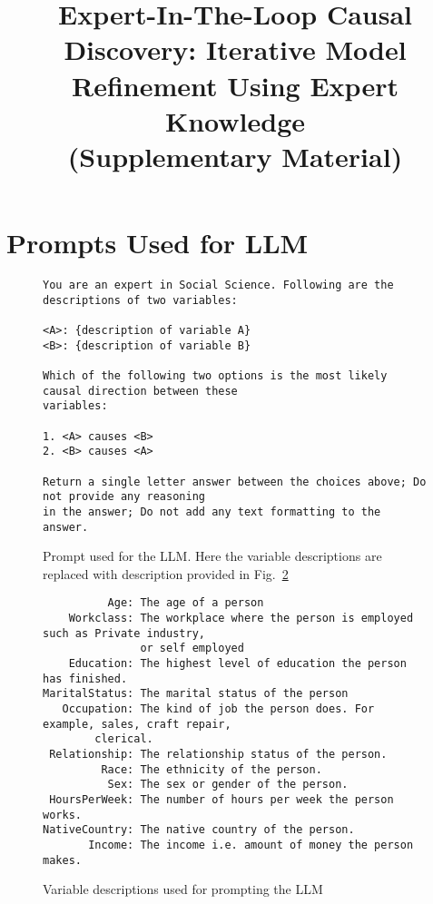 \onecolumn
\title{Expert-In-The-Loop Causal Discovery: Iterative Model Refinement Using Expert Knowledge \\ (Supplementary Material)}
\maketitle
\appendix

\section{Prompts Used for LLM}
\label{section:llms}

\begin{figure}[ht!]
	\centering
	\begin{verbatim}
You are an expert in Social Science. Following are the descriptions of two variables:

<A>: {description of variable A}
<B>: {description of variable B}

Which of the following two options is the most likely causal direction between these 
variables:

1. <A> causes <B>
2. <B> causes <A>

Return a single letter answer between the choices above; Do not provide any reasoning 
in the answer; Do not add any text formatting to the answer.
	\end{verbatim}
	\caption{Prompt used for the LLM. Here the variable descriptions are replaced with description provided in Fig.~\ref{fig:var_description}}
	\label{fig:prompt}
\end{figure}

\begin{figure}[ht!]
	\begin{verbatim}
          Age: The age of a person
    Workclass: The workplace where the person is employed such as Private industry, 
     	       or self employed
    Education: The highest level of education the person has finished.
MaritalStatus: The marital status of the person
   Occupation: The kind of job the person does. For example, sales, craft repair, 
   		clerical.
 Relationship: The relationship status of the person.
         Race: The ethnicity of the person.
          Sex: The sex or gender of the person.
 HoursPerWeek: The number of hours per week the person works.
NativeCountry: The native country of the person.
       Income: The income i.e. amount of money the person makes.
	\end{verbatim}
	\caption{Variable descriptions used for prompting the LLM}
	\label{fig:var_description}
\end{figure}

